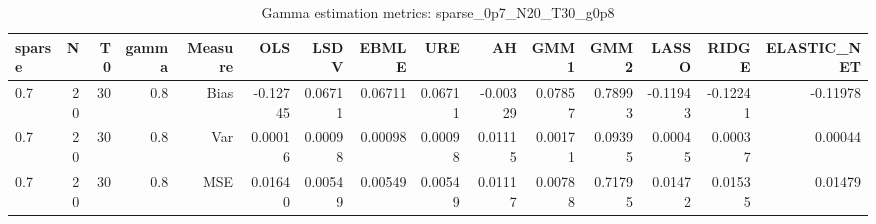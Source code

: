 \begin{table}[!htbp]\centering
\caption{Gamma estimation metrics: sparse_0p7_N20_T30_g0p8}
\label{tab:table1_sparse_0p7_N20_T30_g0p8}
\begin{tabular}{lrrrrrrrrrrrrrr}
\hline
sparse & N & T0 & gamma & Measure & OLS & LSDV & EBMLE & URE & AH & GMM1 & GMM2 & LASSO & RIDGE & ELASTIC_NET \\
\hline
0.7 & 20 & 30 & 0.8 & Bias & -0.12745 & 0.06711 & 0.06711 & 0.06711 & -0.00329 & 0.07857 & 0.78993 & -0.11943 & -0.12241 & -0.11978 \\
0.7 & 20 & 30 & 0.8 & Var & 0.00016 & 0.00098 & 0.00098 & 0.00098 & 0.01115 & 0.00171 & 0.09395 & 0.00045 & 0.00037 & 0.00044 \\
0.7 & 20 & 30 & 0.8 & MSE & 0.01640 & 0.00549 & 0.00549 & 0.00549 & 0.01117 & 0.00788 & 0.71795 & 0.01472 & 0.01535 & 0.01479 \\
\hline
\end{tabular}
\end{table}


